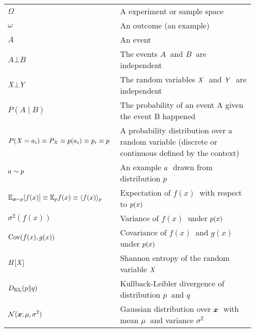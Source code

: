 \bgroup{}
\begin{tabular}{>{\centering}p{1.2in}p{4in}}
  \(\displaystyle \Omega~\) & A experiment or sample space\\
  \(\displaystyle \omega~\) & An outcome (an example)\\
  \(\displaystyle A~\) & An event\\
  \(\displaystyle A \bot B~\) & The events  \(A~\) and  \(B~\) are independent\\
  \(\displaystyle {\mathit{X}} \bot {\mathit{Y}}~\) & The random variables  \({\mathit{X}}~\) and  \({\mathit{Y}}~\) are independent\\
  \(\displaystyle P(A \mid B)~\) & The probability of an event A given the event B happened\\
  \(\displaystyle P({\mathit{X}}={a}_i) \equiv P_{{\mathit{X}}} \equiv p({a}_i) \equiv p_i \equiv p~\) & A probability distribution over a random variable (discrete or continuous defined by the context) \\
  \(\displaystyle {a} \sim p~\) & An example  \({a}~\) drawn from distribution \(p~\) \\
  \(\displaystyle  \mathbb{E}_{{\bm{x}}\sim p} [ f(x) ] \equiv \mathbb{E}_p f(x) \equiv \langle f(x) \rangle_p ~\)& Expectation of \(f(x)~\) with respect to \(p({x})~\) \\
  \(\displaystyle \sigma^2(f(x)) ~\) & Variance of \(f(x)~\) under \(p({x})~\) \\
  \(\displaystyle \mathrm{Cov}(f(x),g(x)) ~\) & Covariance of \(f(x)~\) and \(g(x)~\) under \(p({x})~\) \\
  \(\displaystyle H[{\mathit{X}}] ~\) & Shannon entropy of the random variable  \({\mathit{X}}~\) \\
  \(\displaystyle D_{\mathrm{KL}} ( p \Vert q ) ~\) & Kullback-Leibler divergence of distribution \(p~\) and \(q~\) \\
  \(\displaystyle \mathcal{N} ( {\bm{x}} ; \mu , \sigma^2)~\) & Gaussian distribution over  \({\bm{x}}~\) with mean  \(\mu~\) and variance  \(\sigma^2~\) \\
\end{tabular}
\egroup{}

